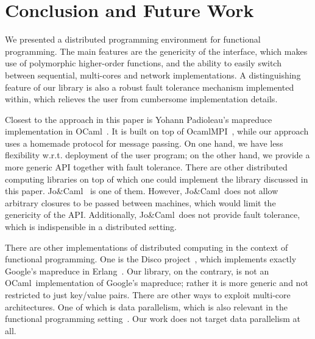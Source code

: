 \documentclass[preprint]{sigplanconf}
\newcommand{\Ocaml}{OCaml}
\newcommand{\JoCaml}{Jo{\&\!}Caml}
\begin{document}



\section{Conclusion and Future Work}\label{sec:future}

We presented a distributed programming environment for functional
programming. The main features are the genericity of the interface,
which makes use of polymorphic higher-order functions, and the ability
to easily switch between sequential, multi-cores and network
implementations. A distinguishing feature of our library is also a
robust fault tolerance mechanism implemented within, which relieves
the user from cumbersome implementation details.

Closest to the approach in this paper is Yohann Padioleau's mapreduce
implementation in \Ocaml~\cite{poor-man-mapreduce}.  It is built on
top of OcamlMPI~\cite{ocamlMPI}, while our approach uses a homemade
protocol for message passing.  On one hand, we have less flexibility
w.r.t. deployment of the user program; on the other hand, we provide a
more generic API together with fault tolerance.  There are other
distributed computing libraries on top of which one could implement
the library discussed in this paper. \JoCaml~\cite{jocaml} is one of
them. However, \JoCaml\ does not allow arbitrary closures to be passed
between machines, which would limit the genericity of the
API. Additionally, \JoCaml\ does not provide fault tolerance, which is
indispensible in a distributed setting.

There are other implementations of distributed computing in the
context of functional programming. One is the Disco
project~\cite{disco}, which implements exactly Google's mapreduce in
Erlang~\cite{erlang}. Our library, on the contrary, is not an \Ocaml\
implementation of Google's mapreduce; rather it is more generic and
not restricted to just key/value pairs.
There are other ways to exploit multi-core architectures. One of which
is data parallelism, which is also relevant in the functional
programming setting~\cite{parallel-haskell}. Our work
does not target data parallelism at all.
\end{document}
